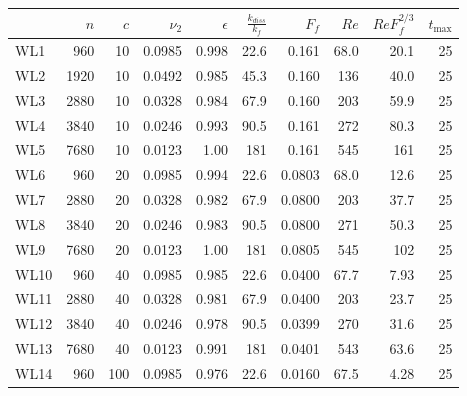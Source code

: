\begin{table}
\begin{center}

\begin{tabular}{lrrrrrrrrr}
\toprule
{} &   $n$ &  $c$ &  $\nu_2$ &  $\epsilon$ &  $\frac{k_{diss}}{k_f}$ &   $F_f$ &  $Re$ &  $ReF_f^{2/3}$ &  $t_{\max}$ \\
\midrule
WL1  &   960 &   10 &   0.0985 &       0.998 &                    22.6 &   0.161 &  68.0 &           20.1 &          25 \\
WL2  &  1920 &   10 &   0.0492 &       0.985 &                    45.3 &   0.160 &   136 &           40.0 &          25 \\
WL3  &  2880 &   10 &   0.0328 &       0.984 &                    67.9 &   0.160 &   203 &           59.9 &          25 \\
WL4  &  3840 &   10 &   0.0246 &       0.993 &                    90.5 &   0.161 &   272 &           80.3 &          25 \\
WL5  &  7680 &   10 &   0.0123 &        1.00 &                     181 &   0.161 &   545 &            161 &          25 \\
WL6  &   960 &   20 &   0.0985 &       0.994 &                    22.6 &  0.0803 &  68.0 &           12.6 &          25 \\
WL7  &  2880 &   20 &   0.0328 &       0.982 &                    67.9 &  0.0800 &   203 &           37.7 &          25 \\
WL8  &  3840 &   20 &   0.0246 &       0.983 &                    90.5 &  0.0800 &   271 &           50.3 &          25 \\
WL9  &  7680 &   20 &   0.0123 &        1.00 &                     181 &  0.0805 &   545 &            102 &          25 \\
WL10 &   960 &   40 &   0.0985 &       0.985 &                    22.6 &  0.0400 &  67.7 &           7.93 &          25 \\
WL11 &  2880 &   40 &   0.0328 &       0.981 &                    67.9 &  0.0400 &   203 &           23.7 &          25 \\
WL12 &  3840 &   40 &   0.0246 &       0.978 &                    90.5 &  0.0399 &   270 &           31.6 &          25 \\
WL13 &  7680 &   40 &   0.0123 &       0.991 &                     181 &  0.0401 &   543 &           63.6 &          25 \\
WL14 &   960 &  100 &   0.0985 &       0.976 &                    22.6 &  0.0160 &  67.5 &           4.28 &          25 \\

\end{tabular}
\end{center}
\end{table}
